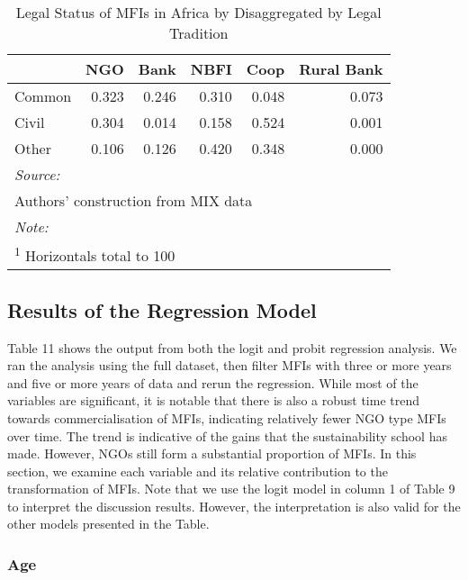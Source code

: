 \documentclass[a4paper,nobind]{templates/ociamthesis}
\begin{document}
\begin{table}

\caption{\label{tab:unnamed-chunk-18}Legal Status of MFIs in Africa by Disaggregated by Legal Tradition}
\centering
\begin{tabular}[t]{lrrrrr}
\toprule
  & NGO & Bank & NBFI & Coop & Rural Bank\\
\midrule
Common & 0.323 & 0.246 & 0.310 & 0.048 & 0.073\\
Civil & 0.304 & 0.014 & 0.158 & 0.524 & 0.001\\
Other & 0.106 & 0.126 & 0.420 & 0.348 & 0.000\\
\bottomrule
\multicolumn{6}{l}{\rule{0pt}{1em}\textit{Source: }}\\
\multicolumn{6}{l}{\rule{0pt}{1em}Authors' construction from MIX data}\\
\multicolumn{6}{l}{\rule{0pt}{1em}\textit{Note: }}\\
\multicolumn{6}{l}{\rule{0pt}{1em}\textsuperscript{1} Horizontals total to 100}\\
\end{tabular}
\end{table}

\newpage

\hypertarget{results-of-the-regression-model}{%
\subsection{Results of the Regression Model}\label{results-of-the-regression-model}}

Table 11 shows the output from both the logit and probit regression analysis. We ran the analysis using the full dataset, then filter MFIs with three or more years and five or more years of data and rerun the regression. While most of the variables are significant, it is notable that there is also a robust time trend towards commercialisation of MFIs, indicating relatively fewer NGO type MFIs over time. The trend is indicative of the gains that the sustainability school has made. However, NGOs still form a substantial proportion of MFIs. In this section, we examine each variable and its relative contribution to the transformation of MFIs. Note that we use the logit model in column 1 of Table 9 to interpret the discussion results. However, the interpretation is also valid for the other models presented in the Table.

\hypertarget{age}{%
\subsubsection{Age}\label{age}}
\end{document}
